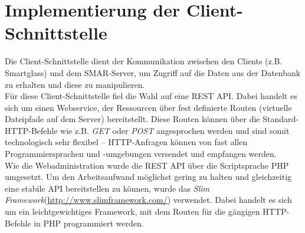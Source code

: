 \chapter{Implementierung der Client-Schnittstelle}
\label{cha:impl_api}

Die Client-Schnittstelle dient der Kommunikation zwischen den Clients (z.B. Smartglass) und dem \acs{SMAR}-Server, um Zugriff auf die Daten aus der Datenbank zu erhalten und diese zu manipulieren.\\

Für diese Client-Schnittstelle fiel die Wahl auf eine \acs{REST} \acs{API}. Dabei handelt es sich um einen Webservice, der Ressourcen über fest definierte Routen (virtuelle Dateipfade auf dem Server) bereitstellt. Diese Routen können über die Standard-\acs{HTTP}-Befehle wie z.B. \emph{GET} oder \emph{POST} angesprochen werden und sind somit technologisch sehr flexibel -- \acs{HTTP}-Anfragen können von fast allen Programmiersprachen und -umgebungen versendet und empfangen werden.\\

Wie die Webadministration wurde die \acs{REST} \acs{API} über die Scriptsprache \acs{PHP} umgesetzt. Um den Arbeitsaufwand möglichst gering zu halten und gleichzeitig eine stabile API bereitstellen zu können, wurde das \emph{Slim Framework}(\url{http://www.slimframework.com/}) verwendet. Dabei handelt es sich um ein leichtgewichtiges Framework, mit dem Routen für die gängigen \acs{HTTP}-Befehle in \acs{PHP} programmiert werden.\\



